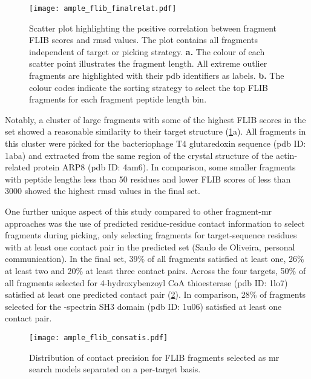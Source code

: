 \begin{figure}[H]
	\centering
	\texttt{[image: ample\_flib\_finalrelat.pdf]}
        \caption[Correlation analysis for FLIB MR fragments]{Scatter plot highlighting the positive correlation between fragment FLIB scores and \gls{rmsd} values. The plot contains all fragments independent of target or picking strategy. \textbf{a.} The colour of each scatter point illustrates the fragment length. All extreme outlier fragments are highlighted with their \gls{pdb} identifiers as labels. \textbf{b.} The colour codes indicate the sorting strategy to select the top FLIB fragments for each fragment peptide length bin.}
	\label{fig:ample_flib_finalrelat}
\end{figure}

Notably, a cluster of large fragments with some of the highest FLIB scores in the set showed a reasonable similarity to their target structure (\cref{fig:ample_flib_finalrelat}a). All fragments in this cluster were picked for the bacteriophage T4 glutaredoxin sequence (\gls{pdb} ID: 1aba) and extracted from the same region of the crystal structure of the actin-related protein ARP8 (\gls{pdb} ID: 4am6). In comparison, some smaller fragments with peptide lengths less than 50 residues and lower FLIB scores of less than 3000 showed the highest \gls{rmsd} values in the final set.

One further unique aspect of this study compared to other fragment-\gls{mr} approaches was the use of predicted residue-residue contact information to select fragments during picking, only selecting fragments for target-sequence residues with at least one contact pair in the predicted set (Saulo de Oliveira, personal communication). In the final set, 39\% of all fragments satisfied at least one, 26\% at least two and 20\% at least three contact pairs. Across the four targets, 50\% of all fragments selected for 4-hydroxybenzoyl CoA thioesterase (\gls{pdb} ID: 1lo7) satisfied at least one predicted contact pair (\cref{fig:ample_flib_consatis}). In comparison, 28\% of fragments selected for the \textalpha-spectrin SH3 domain (\gls{pdb} ID: 1u06) satisfied at least one contact pair.

\begin{figure}[H]
	\centering
	\texttt{[image: ample\_flib\_consatis.pdf]}
	\caption[Distribution of contact precision for FLIB fragments]{Distribution of contact precision for FLIB fragments selected as \gls{mr} search models separated on a per-target basis.}
	\label{fig:ample_flib_consatis}
\end{figure}

